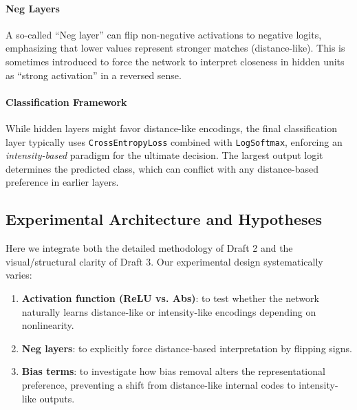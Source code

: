 \paragraph{Neg Layers}
A so-called ``Neg layer'' can flip non-negative activations to negative logits, emphasizing that lower values represent stronger matches (distance-like). This is sometimes introduced to force the network to interpret closeness in hidden units as ``strong activation'' in a reversed sense.

\paragraph{Classification Framework}
While hidden layers might favor distance-like encodings, the final classification layer typically uses \texttt{CrossEntropyLoss} combined with \texttt{LogSoftmax}, enforcing an \emph{intensity-based} paradigm for the ultimate decision. The largest output logit determines the predicted class, which can conflict with any distance-based preference in earlier layers.

\subsection{Experimental Architecture and Hypotheses}

Here we integrate both the detailed methodology of Draft 2 and the visual/structural clarity of Draft 3. Our experimental design systematically varies:
\begin{enumerate}
    \item \textbf{Activation function (ReLU vs. Abs)}: to test whether the network naturally learns distance-like or intensity-like encodings depending on nonlinearity.
    \item \textbf{Neg layers}: to explicitly force distance-based interpretation by flipping signs.
    \item \textbf{Bias terms}: to investigate how bias removal alters the representational preference, preventing a shift from distance-like internal codes to intensity-like outputs.
\end{enumerate}


